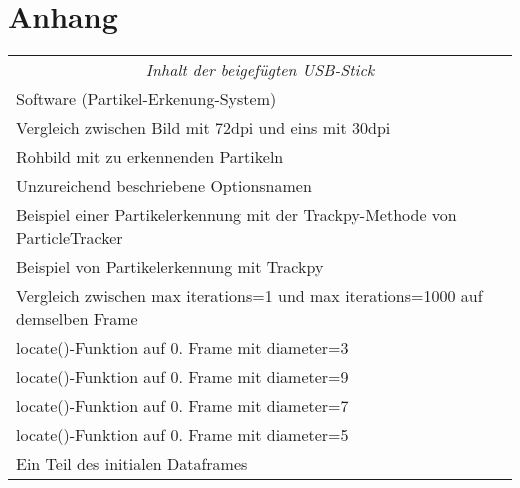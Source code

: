\chapter*{Anhang}
 
 
\begin{tabularx}{\textwidth}{Xr}
\multicolumn{2}{c}{\emph{Inhalt der beigefügten USB-Stick}}\\
\addlinespace[1em]

Software (Partikel-Erkenung-System) \dotfill &  \pageref{kap6}\\

Vergleich zwischen Bild mit 72dpi und eins mit 30dpi \dotfill  &   \pageref{fig:kap0_72dpivs30dpi}\\

Rohbild mit zu erkennenden Partikeln \dotfill  &   \pageref{fig:kap1_rohbild}\\

Unzureichend beschriebene Optionsnamen \dotfill  &   \pageref{fig:kap1_PT_Nicht_Intuitiv}\\

Beispiel einer Partikelerkennung mit der Trackpy-Methode von ParticleTracker \dotfill  &   \pageref{fig:kap1_PT_Beispiel}\\

Beispiel von Partikelerkennung mit Trackpy \dotfill  &   \pageref{fig:kap1_Trackpy_beispiel}\\

Vergleich zwischen max iterations=1 und max iterations=1000 auf demselben Frame \dotfill  &   \pageref{fig:comparison max-iterations}\\

locate()-Funktion auf 0. Frame mit diameter=3 \dotfill  &   \pageref{fig:kap3_d=3}\\

locate()-Funktion auf 0. Frame mit diameter=9 \dotfill  &   \pageref{fig:kap3_d=9}\\

locate()-Funktion auf 0. Frame mit diameter=7 \dotfill  &   \pageref{fig:kap3_d=7}\\

locate()-Funktion auf 0. Frame mit diameter=5 \dotfill  &   \pageref{fig:kap3_d=5}\\

Ein Teil des initialen Dataframes \dotfill  &   \pageref{fig:kap3_initDataframe}\\


\end{tabularx}
